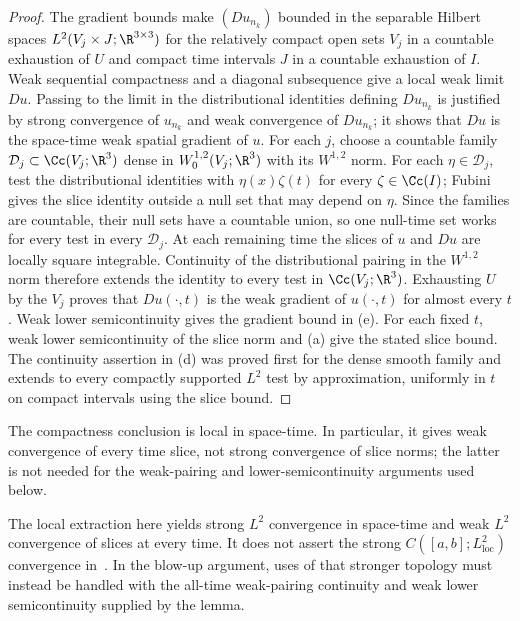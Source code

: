\documentclass[11pt,reqno]{amsart}
\begin{document}
\begin{proof}
The gradient bounds make $(Du_{n_k})$ bounded in the separable Hilbert spaces $L^2(V_j\times J;\R^{3\times3})$ for the relatively compact open sets $V_j$ in a countable exhaustion of $U$ and compact time intervals $J$ in a countable exhaustion of $I$. Weak sequential compactness and a diagonal subsequence give a local weak limit $Du$. Passing to the limit in the distributional identities defining $Du_{n_k}$ is justified by strong convergence of $u_{n_k}$ and weak convergence of $Du_{n_k}$; it shows that $Du$ is the space-time weak spatial gradient of $u$. For each $j$, choose a countable family
$\mathcal D_j\subset\Cc(V_j;\R^3)$ dense in
$W^{1,2}_0(V_j;\R^3)$ with its $W^{1,2}$ norm. For each
$\eta\in\mathcal D_j$, test the distributional identities with
$\eta(x)\zeta(t)$ for every $\zeta\in\Cc(I)$; Fubini gives the
slice identity outside a null set that may depend on $\eta$. Since the
families are countable, their null sets have a countable union, so one
null-time set works for every test in every $\mathcal D_j$. At each
remaining time the slices of $u$ and $Du$ are locally square integrable.
Continuity of the distributional pairing in the $W^{1,2}$ norm therefore
extends the identity to every test in $\Cc(V_j;\R^3)$. Exhausting $U$
by the $V_j$ proves that $Du(\cdot,t)$ is the weak gradient of
$u(\cdot,t)$ for almost every $t$. Weak lower semicontinuity gives the gradient bound in (e). For each fixed $t$, weak lower semicontinuity of the slice norm and (a) give the stated slice bound. The continuity assertion in (d) was proved first for the dense smooth family and extends to every compactly supported $L^2$ test by approximation, uniformly in $t$ on compact intervals using the slice bound.
\end{proof}

The compactness conclusion is local in space-time. In particular, it gives weak convergence of every time slice, not strong convergence of slice norms; the latter is not needed for the weak-pairing and lower-semicontinuity arguments used below.

\begin{remark}
The local extraction here yields strong $L^2$ convergence in space-time and weak $L^2$ convergence of slices at every time. It does not assert the strong $C([a,b];L^2_{\mathrm{loc}})$ convergence in~\cite[(3.23), p.~225]{ESS2003}. In the blow-up argument, uses of that stronger topology must instead be handled with the all-time weak-pairing continuity and weak lower semicontinuity supplied by the lemma.
\end{remark}
\end{document}

